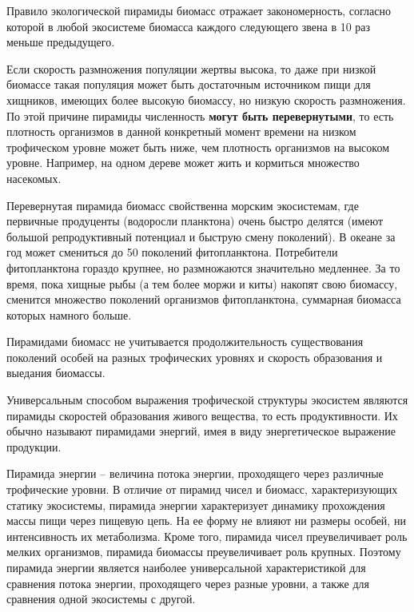 \documentclass[a5paper, 11pt]{extarticle}
\theoremstyle{definition}
\theoremstyle{definition}
\theoremstyle{definition}
\numberwithin{figure}{section}
\begin{document}
Правило экологической пирамиды биомасс отражает закономерность, согласно которой в любой экосистеме биомасса каждого следующего звена в 10 раз меньше предыдущего.

Если скорость размножения популяции жертвы высока, то даже при низкой биомассе такая популяция может быть достаточным источником пищи для хищников, имеющих более высокую биомассу, но низкую скорость размножения. По этой причине пирамиды численность \textbf{могут быть перевернутыми}, то есть плотность организмов в данной конкретный момент времени на низком трофическом уровне может быть ниже, чем плотность организмов на высоком уровне. Например, на одном дереве может жить и кормиться множество насекомых.

Перевернутая пирамида биомасс свойственна морским экосистемам, где первичные продуценты (водоросли планктона) очень быстро делятся (имеют большой репродуктивный потенциал и быструю смену поколений). В океане за год может смениться до 50 поколений фитопланктона. Потребители фитопланктона гораздо крупнее, но размножаются значительно медленнее. За то время, пока хищные рыбы (а тем более моржи и киты) накопят свою биомассу, сменится множество поколений организмов фитопланктона, суммарная биомасса которых намного больше.

Пирамидами биомасс не учитывается продолжительность существования поколений особей на разных трофических уровнях и скорость образования и выедания биомассы.

Универсальным способом выражения трофической структуры экосистем являются пирамиды скоростей образования живого вещества, то есть продуктивности. Их обычно называют пирамидами энергий, имея в виду энергетическое выражение продукции.

Пирамида энергии -- величина потока энергии, проходящего через различные трофические уровни. В отличие от пирамид чисел и биомасс, характеризующих статику экосистемы, пирамида энергии характеризует динамику прохождения массы пищи через пищевую цепь. На ее форму не влияют ни размеры особей, ни интенсивность их метаболизма. Кроме того, пирамида чисел преувеличивает роль мелких организмов, пирамида биомассы преувеличивает роль крупных. Поэтому пирамида энергии является наиболее универсальной характеристикой для сравнения потока энергии, проходящего через разные уровни, а также для сравнения одной экосистемы с другой.
\end{document}
